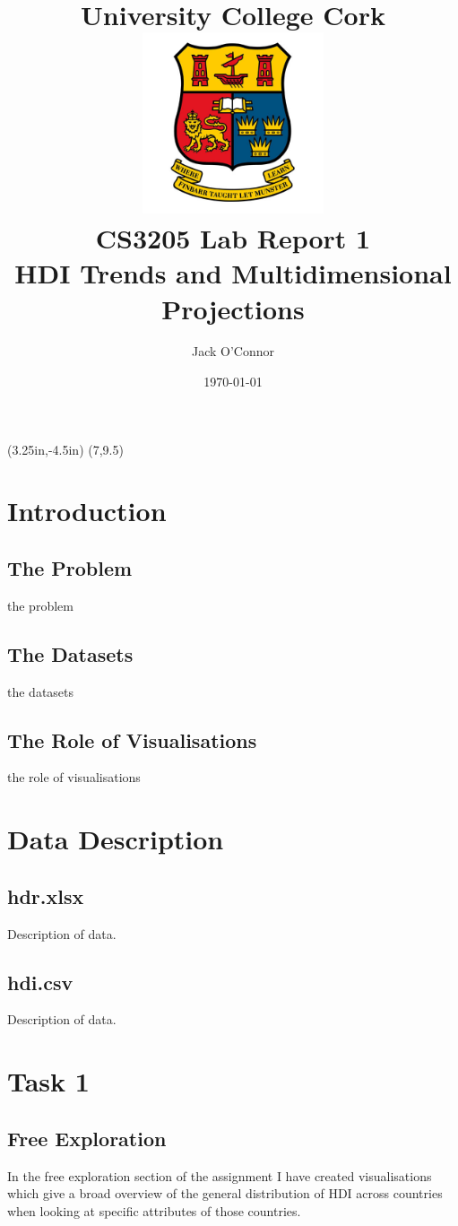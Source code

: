 \documentclass[11pt,a4paper,final]{article}
\title{
	\vspace{3.5cm}
	University College Cork \\ [1cm]
	\includegraphics[width=0.4\textwidth]{ucc_crest} \\ [1cm]
	CS3205 Lab Report 1 \\ [0.5cm]
	HDI Trends and Multidimensional Projections
}
\author{Jack O'Connor}
\date{\today}
\begin{document}
\thisfancyput(3.25in,-4.5in){%
  \setlength{\unitlength}{1in}\fancyoval(7,9.5)}
\maketitle
\pagebreak

{
\hypersetup{hidelinks}
\tableofcontents
}
\pagebreak
\setcounter{page}{1}

\begin{multicols}{2}
\section{Introduction}
\subsection{The Problem}
the problem

\subsection{The Datasets}
the datasets

\subsection{The Role of Visualisations}
the role of visualisations


\section{Data Description}
\subsection{hdr.xlsx}
Description of data.
\subsection{hdi.csv}
Description of data.


\section{Task 1}
\subsection{Free Exploration}
In the free exploration section of the assignment I have created visualisations which give a broad overview of the general distribution of HDI across countries when looking at specific attributes of those countries.


\end{multicols}
\end{document}
